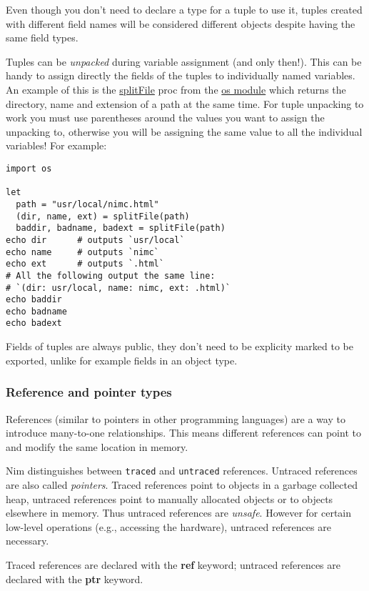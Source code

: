 Even though you don't need to declare a type for a tuple to use it,
tuples created with different field names will be considered different
objects despite having the same field types.

Tuples can be \emph{unpacked} during variable assignment (and only
then!). This can be handy to assign directly the fields of the tuples to
individually named variables. An example of this is the
\href{os.html\#splitFile,string}{splitFile} proc from the
\href{os.html}{os module} which returns the directory, name and
extension of a path at the same time. For tuple unpacking to work you
must use parentheses around the values you want to assign the unpacking
to, otherwise you will be assigning the same value to all the individual
variables! For example:

\begin{verbatim}
import os

let
  path = "usr/local/nimc.html"
  (dir, name, ext) = splitFile(path)
  baddir, badname, badext = splitFile(path)
echo dir      # outputs `usr/local`
echo name     # outputs `nimc`
echo ext      # outputs `.html`
# All the following output the same line:
# `(dir: usr/local, name: nimc, ext: .html)`
echo baddir
echo badname
echo badext
\end{verbatim}

Fields of tuples are always public, they don't need to be explicity
marked to be exported, unlike for example fields in an object type.

\hypertarget{reference-and-pointer-types}{%
\subsubsection{Reference and pointer
types}\label{reference-and-pointer-types}}

References (similar to pointers in other programming languages) are a
way to introduce many-to-one relationships. This means different
references can point to and modify the same location in memory.

Nim distinguishes between \texttt{traced} and \texttt{untraced}
references. Untraced references are also called \emph{pointers}. Traced
references point to objects in a garbage collected heap, untraced
references point to manually allocated objects or to objects elsewhere
in memory. Thus untraced references are \emph{unsafe}. However for
certain low-level operations (e.g., accessing the hardware), untraced
references are necessary.

Traced references are declared with the \textbf{ref} keyword; untraced
references are declared with the \textbf{ptr} keyword.

